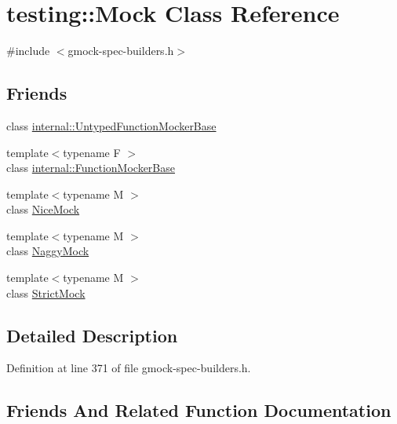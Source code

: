 \hypertarget{classtesting_1_1_mock}{}\section{testing\+:\+:Mock Class Reference}
\label{classtesting_1_1_mock}


{\ttfamily \#include $<$gmock-\/spec-\/builders.\+h$>$}

\subsection*{Friends}
\begin{DoxyCompactItemize}
\item 
class \hyperlink{classtesting_1_1_mock_aa199ba5b2fe114afc42c43912a582feb}{internal\+::\+Untyped\+Function\+Mocker\+Base}
\item 
{\footnotesize template$<$typename F $>$ }\\class \hyperlink{classtesting_1_1_mock_a1945aea400fdb50639e5cdf43c583687}{internal\+::\+Function\+Mocker\+Base}
\item 
{\footnotesize template$<$typename M $>$ }\\class \hyperlink{classtesting_1_1_mock_a9e796f79d4c876398f83aa7678dddc46}{Nice\+Mock}
\item 
{\footnotesize template$<$typename M $>$ }\\class \hyperlink{classtesting_1_1_mock_aee2e427ecb34e6662477add3bb5f8819}{Naggy\+Mock}
\item 
{\footnotesize template$<$typename M $>$ }\\class \hyperlink{classtesting_1_1_mock_a88b3d71476c27b82c88bd49e8297e20e}{Strict\+Mock}
\end{DoxyCompactItemize}


\subsection{Detailed Description}


Definition at line 371 of file gmock-\/spec-\/builders.\+h.



\subsection{Friends And Related Function Documentation}
